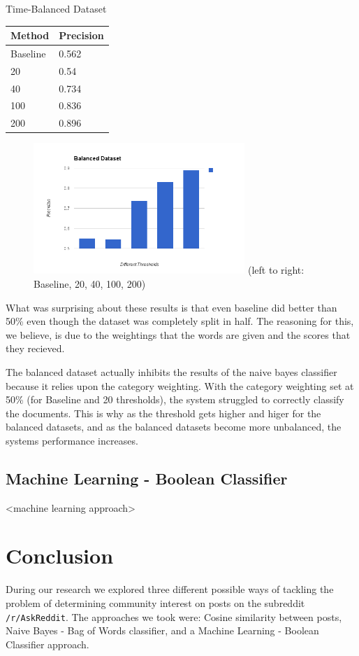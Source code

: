 \documentclass{acm_proc_article-sp}
\begin{document}
Time-Balanced Dataset\\
\begin{tabular}{l|l}
Method & Precision\\
\hline
Baseline & 0.562\\
20 & 0.54\\
40 & 0.734\\
100 & 0.836\\
200 & 0.896\\
\end{tabular}

\begin{figure}[h!]
\includegraphics[width=8cm]{time-balanced-dataset-keyword.png}
(left to right: Baseline, 20, 40, 100, 200)
\end{figure}

What was surprising about these results is that even baseline did better than 50\% even though the dataset was completely split in half. The reasoning for this, we believe, is due to the weightings that the words are given and the scores that they recieved. 

The balanced dataset actually inhibits the results of the naive bayes classifier because it relies upon the category weighting. With the category weighting set at 50\% (for Baseline and 20 thresholds), the system struggled to correctly classify the documents. This is why as the threshold gets higher and higer for the balanced datasets, and as the balanced datasets become more unbalanced, the systems performance increases.

\subsection{Machine Learning - Boolean Classifier}
<machine learning approach>



\section{Conclusion}
During our research we explored three different possible ways of tackling the problem of determining community interest on posts on the subreddit \texttt{/r/AskReddit}. The approaches we took were: Cosine similarity between posts, Naive Bayes - Bag of Words classifier, and a Machine Learning - Boolean Classifier approach. 
\end{document}
